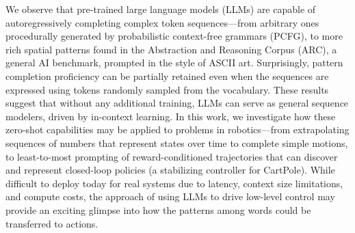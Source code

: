 We observe that pre-trained large language models (LLMs) are capable of autoregressively completing complex token sequences---from arbitrary ones procedurally generated by probabilistic context-free grammars (PCFG), to more rich spatial patterns found in the Abstraction and Reasoning Corpus (ARC), a general AI benchmark, prompted in the style of ASCII art. Surprisingly, pattern completion proficiency can be partially retained even when the sequences are expressed using tokens randomly sampled from the vocabulary. These results suggest that without any additional training, LLMs can serve as general sequence modelers, driven by in-context learning. In this work, we investigate how these zero-shot capabilities may be applied to problems in robotics---from extrapolating sequences of numbers that represent states over time to complete simple motions, to least-to-most prompting of reward-conditioned trajectories that can discover and represent closed-loop policies (\eg a stabilizing controller for CartPole). While difficult to deploy today for real systems due to latency, context size limitations, and compute costs, the approach of using LLMs to drive low-level control may provide an exciting glimpse into how the patterns among words could be transferred to actions.
